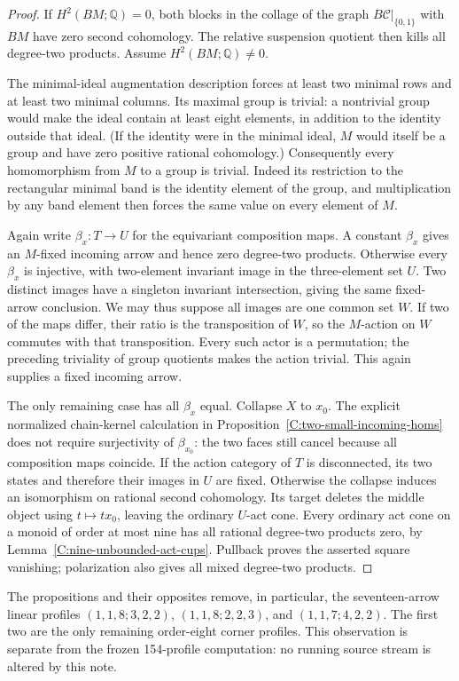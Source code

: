 \begin{proof}
If $H^2(BM;\mathbb Q)=0$, both blocks in the collage of the
graph $B\mathcal C|_{\{0,1\}}$ with $BM$ have zero second
cohomology.  The relative suspension quotient then kills all
degree-two products.  Assume $H^2(BM;\mathbb Q)\ne0$.

The minimal-ideal augmentation description forces at least two
minimal rows and at least two minimal columns.  Its maximal group
is trivial: a nontrivial group would make the ideal contain at
least eight elements, in addition to the identity outside that
ideal.  (If the identity were in the minimal ideal, $M$ would
itself be a group and have zero positive rational cohomology.)
Consequently every homomorphism from $M$ to a group is trivial.
Indeed its restriction to the rectangular minimal band is the
identity element of the group, and multiplication by any band
element then forces the same value on every element of $M$.

Again write $\beta_x:T\to U$ for the equivariant composition
maps.  A constant $\beta_x$ gives an $M$-fixed incoming arrow
and hence zero degree-two products.  Otherwise every $\beta_x$
is injective, with two-element invariant image in the three-element
set $U$.  Two distinct images have a singleton invariant
intersection, giving the same fixed-arrow conclusion.
We may thus suppose all images are one common set $W$.
If two of the maps differ, their ratio is the transposition of
$W$, so the $M$-action on $W$ commutes with that transposition.
Every such actor is a permutation; the preceding triviality of
group quotients makes the action trivial.  This again supplies
a fixed incoming arrow.

The only remaining case has all $\beta_x$ equal.  Collapse $X$
to $x_0$.  The explicit normalized chain-kernel calculation in
Proposition~\ref{C:two-small-incoming-homs} does not require
surjectivity of $\beta_{x_0}$: the two faces still cancel because
all composition maps coincide.  If the action category of $T$
is disconnected, its two states and therefore their images in
$U$ are fixed.  Otherwise the collapse induces an isomorphism
on rational second cohomology.  Its target deletes the middle
object using $t\mapsto tx_0$, leaving the ordinary $U$-act cone.
Every ordinary act cone on a monoid of order at most nine has
all rational degree-two products zero, by
Lemma~\ref{C:nine-unbounded-act-cups}.  Pullback proves the
asserted square vanishing; polarization also gives all mixed
degree-two products.
\end{proof}

\begin{remark}\label{C:two-small-incoming-homs-scope}
The propositions and their opposites remove, in particular, the
seventeen-arrow linear profiles $(1,1,8;3,2,2)$,
$(1,1,8;2,2,3)$, and $(1,1,7;4,2,2)$.
The first two are the only remaining order-eight corner profiles.
This observation is separate from the frozen
154-profile computation: no running source stream is altered by
this note.
\end{remark}
